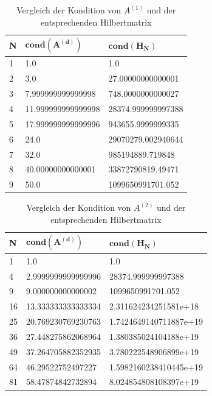 \documentclass{scrartcl}
\begin{document}
\begin{table}[ht!]
\centering
\begin{tabular}{|l|l|l|}
\hline
\textbf{N} & $\mathbf{cond(A^{(d)})}$ & $\mathbf{cond(H_N)}$   \\ \hline
1          & 1.0                       & 1.0                \\ \hline
2          & 3.0                       & 27.00000000000001  \\ \hline
3          & 7.999999999999998         & 748.0000000000027  \\ \hline
4          & 11.999999999999998        & 28374.999999997388 \\ \hline
5          & 17.999999999999996        & 943655.9999999335  \\ \hline
6          & 24.0                      & 29070279.002940644 \\ \hline
7          & 32.0                      & 985194889.719848   \\ \hline
8          & 40.00000000000001         & 33872790819.49471  \\ \hline
9          & 50.0                      & 1099650991701.052  \\ \hline
\end{tabular}
\caption{Vergleich der Kondition von $A^{(1)}$ und der entsprechenden Hilbertmatrix}
\end{table}

\begin{table}[ht!]
\centering
\begin{tabular}{|l|l|l|}
\hline
\textbf{N} & $\mathbf{cond(A^{(d)})}$  & $\mathbf{cond(H_N)}$       \\ \hline
1          & 1.0                       & 1.0                    \\ \hline
4          & 2.9999999999999996        & 28374.999999997388     \\ \hline
9          & 9.000000000000002         & 1099650991701.052      \\ \hline
16         & 13.333333333333334        & 2.311624234251581e+18  \\ \hline
25         & 20.769230769230763        & 1.7424649140711887e+19 \\ \hline
36         & 27.448275862068964        & 1.380385024104188e+19  \\ \hline
49         & 37.264705882352935        & 3.780222548906899e+19  \\ \hline
64         & 46.29522752497227         & 1.5982160238410445e+19 \\ \hline
81         & 58.47874842732894         & 8.024854808108397e+19  \\ \hline
\end{tabular}
\caption{Vergleich der Kondition von $A^{(2)}$ und der entsprechenden Hilbertmatrix}
\end{table}
\end{document}
